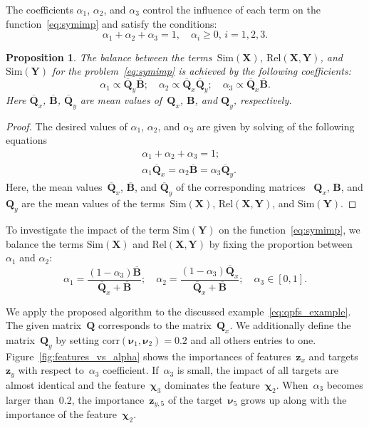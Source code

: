 \documentclass[12pt,twoside]{article}
\newtheorem{proposition}{Proposition}
\theoremstyle{definition}
\newcommand{\bz}{\mathbf{z}}
\newcommand{\bY}{\mathbf{Y}}
\newcommand{\bX}{\mathbf{X}}
\newcommand{\bB}{\mathbf{B}}
\newcommand{\bQ}{\mathbf{Q}}
\newcommand{\bchi}{\boldsymbol{\chi}}
\newcommand{\bnu}{\boldsymbol{\nu}}
\begin{document}
The coefficients $\alpha_1$, $\alpha_2$, and $\alpha_3$ control the influence of each term on the function~\eqref{eq:symimp} and satisfy the conditions:
\begin{equation*}
\alpha_1 + \alpha_2 + \alpha_3 = 1, \quad \alpha_i \geq 0, \, i = 1, 2, 3.
\end{equation*}
\begin{proposition}
	The balance between the terms~$\text{Sim}(\bX)$, $\text{Rel}(\bX, \bY)$, and $\text{Sim}(\bY)$ for the problem~\eqref{eq:symimp} is achieved by the following coefficients:
	\begin{equation}
	\alpha_1 \propto \overline{\bQ}_y \overline{\bB} ; \quad
	\alpha_2 \propto \overline{\bQ}_x \overline{\bQ}_y; \quad
	\alpha_3  \propto \overline{\bQ}_x \overline{\bB}.
	\label{eq:alpha_3}
	\end{equation}
	Here $\overline{\bQ}_x$, $\overline{\bB}$, $\overline{\bQ}_y$ are mean values of~$\bQ_x$, $\bB$, and $\bQ_y$, respectively.
	
\end{proposition}
\begin{proof}
	The desired values of $\alpha_1$, $\alpha_2$, and $\alpha_3$ are given by solving of the following equations
	\begin{align*}
	&\alpha_1 + \alpha_2 + \alpha_3 = 1; \\
	&\alpha_1 \overline{\bQ}_x = \alpha_2 \overline{\bB} = \alpha_3 \overline{\bQ}_y.
	\end{align*}
	Here, the mean values~$\overline{\bQ}_x$, $\overline{\bB}$, and $\overline{\bQ}_y$ of the corresponding matrices ~$\bQ_x$, $\bB$, and $\bQ_y$ are the mean values of the terms~$\text{Sim}(\bX)$, $\text{Rel}(\bX, \bY)$, and $\text{Sim}(\bY)$.
\end{proof}
To investigate the impact of the term $\text{Sim}(\bY)$ on the function~\eqref{eq:symimp}, we balance the terms $\text{Sim}(\bX)$ and $\text{Rel}(\bX, \bY)$ by fixing the proportion between~$\alpha_1$ and $\alpha_2$:
\begin{equation}
\alpha_1 = \frac{(1 - \alpha_3)\overline{\bB}}{\overline{\bQ}_x + \overline{\bB}}; \quad
\alpha_2 = \frac{(1 - \alpha_3)\overline{\bQ}_x}{\overline{\bQ}_x + \overline{\bB}}; \quad
\alpha_3 \in [0, 1].
\label{eq:alphas3}
\end{equation}

We apply the proposed algorithm to the discussed example~\eqref{eq:qpfs_example}.
The given matrix~$\bQ$ corresponds to the matrix~$\bQ_x$.
We additionally define the matrix~$\bQ_y$ by setting $\text{corr}(\bnu_1, \bnu_2) = 0.2$ and all others entries to one.
Figure~\ref{fig:features_vs_alpha} shows the importances of features~$\bz_x$ and targets~$\bz_y$ with respect to~$\alpha_3$ coefficient.
If~$\alpha_3$ is small, the impact of all targets are almost identical and the feature~$\bchi_3$ dominates the feature~$\bchi_2$. When~$\alpha_3$ becomes larger than~$0.2$, the importance~$\bz_{y,5}$ of the target~$\bnu_5$ grows up along with the importance of the feature~$\bchi_2$.
\end{document}
